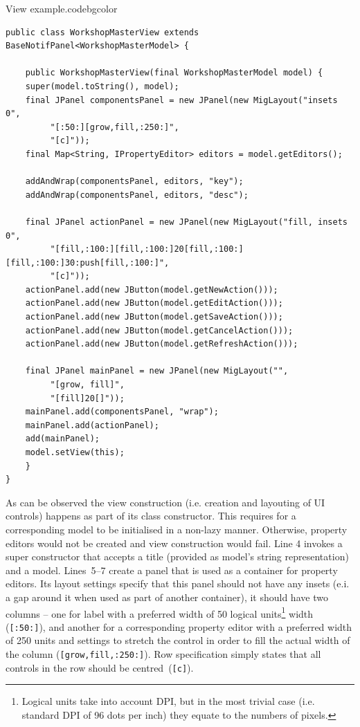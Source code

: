     \begin{code}{View example.}{\label{lst:view_example}}{codebgcolor}
    \begin{lstlisting}
public class WorkshopMasterView extends BaseNotifPanel<WorkshopMasterModel> {    

    public WorkshopMasterView(final WorkshopMasterModel model) {
	super(model.toString(), model);
	final JPanel componentsPanel = new JPanel(new MigLayout("insets 0", 
	     "[:50:][grow,fill,:250:]", 
	     "[c]"));
	final Map<String, IPropertyEditor> editors = model.getEditors();

	addAndWrap(componentsPanel, editors, "key");
	addAndWrap(componentsPanel, editors, "desc");

	final JPanel actionPanel = new JPanel(new MigLayout("fill, insets 0", 
	     "[fill,:100:][fill,:100:]20[fill,:100:][fill,:100:]30:push[fill,:100:]", 
	     "[c]"));
	actionPanel.add(new JButton(model.getNewAction()));
	actionPanel.add(new JButton(model.getEditAction()));
	actionPanel.add(new JButton(model.getSaveAction()));
	actionPanel.add(new JButton(model.getCancelAction()));
	actionPanel.add(new JButton(model.getRefreshAction()));

	final JPanel mainPanel = new JPanel(new MigLayout("", 
	     "[grow, fill]", 
	     "[fill]20[]"));
	mainPanel.add(componentsPanel, "wrap");
	mainPanel.add(actionPanel);
	add(mainPanel);
	model.setView(this);
    }
}
    \end{lstlisting}
  \end{code}
  
  As can be observed the view construction (i.e. creation and layouting of UI controls) happens as part of its class constructor.
  This requires for a corresponding model to be initialised in a non-lazy manner.
  Otherwise, property editors would not be created and view construction would fail.
  Line 4 invokes a super constructor that accepts a title (provided as model's string representation) and a model.
  Lines~5--7 create a panel that is used as a container for property editors.
  Its layout settings specify that this panel should not have any insets (e.i. a gap around it when used as part of another container), it should have two columns -- one for label with a preferred width of 50 logical units\footnote{Logical units take into account DPI, but in the most trivial case (i.e. standard DPI of 96 dots per inch) they equate to the numbers of pixels.} width (\texttt{[:50:]}), and another for a corresponding property editor with a preferred width of 250 units and settings to stretch the control in order to fill the actual width of the column (\texttt{[grow,fill,:250:]}).
  Row specification simply states that all controls in the row should be centred~(\texttt{[c]}).
  
